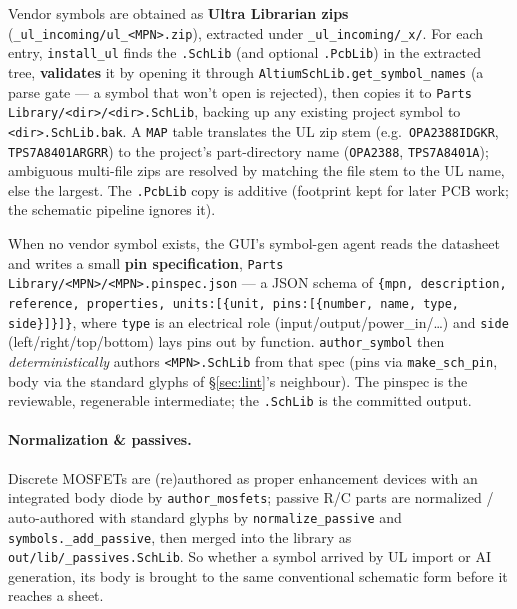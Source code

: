 \documentclass[11pt]{article}
\newcommand{\file}[1]{\texttt{#1}}
\newcommand{\mod}[1]{\texttt{#1}}
\begin{document}
\begin{description}[leftmargin=1.4em]
  \item[(1) Ultra Librarian import \textnormal{(\file{\_ul\_incoming/install\_ul.py})}.]
    Vendor symbols are obtained as \textbf{Ultra Librarian zips}
    (\file{\_ul\_incoming/ul\_<MPN>.zip}), extracted under \file{\_ul\_incoming/\_x/}.
    For each entry, \mod{install\_ul} finds the \file{.SchLib} (and optional
    \file{.PcbLib}) in the extracted tree, \textbf{validates} it by opening it
    through \texttt{AltiumSchLib.get\_symbol\_names} (a parse gate --- a symbol
    that won't open is rejected), then copies it to
    \file{Parts Library/<dir>/<dir>.SchLib}, backing up any existing project
    symbol to \file{<dir>.SchLib.bak}. A \texttt{MAP} table translates the UL zip
    stem (e.g.\ \texttt{OPA2388IDGKR}, \texttt{TPS7A8401ARGRR}) to the project's
    part-directory name (\texttt{OPA2388}, \texttt{TPS7A8401A}); ambiguous
    multi-file zips are resolved by matching the file stem to the UL name, else
    the largest. The \file{.PcbLib} copy is additive (footprint kept for later
    PCB work; the schematic pipeline ignores it).
  \item[(2) AI symbol generation \textnormal{(GUI Library tab $\to$
    \mod{author\_symbol})}.] When no vendor symbol exists, the GUI's symbol-gen
    agent reads the datasheet and writes a small \textbf{pin specification},
    \file{Parts Library/<MPN>/<MPN>.pinspec.json} --- a JSON schema of
    \texttt{\{mpn, description, reference, properties, units:[\{unit, pins:[\{number,
    name, type, side\}]\}]\}}, where \texttt{type} is an electrical role
    (input/output/power\_in/\dots) and \texttt{side} (left/right/top/bottom) lays
    pins out by function. \mod{author\_symbol} then \emph{deterministically}
    authors \file{<MPN>.SchLib} from that spec (pins via \texttt{make\_sch\_pin},
    body via the standard glyphs of \S\ref{sec:lint}'s neighbour). The pinspec is
    the reviewable, regenerable intermediate; the \file{.SchLib} is the committed
    output.
\end{description}

\paragraph{Normalization \& passives.} Discrete MOSFETs are (re)authored as
proper enhancement devices with an integrated body diode by \mod{author\_mosfets};
passive R/C parts are normalized / auto-authored with standard glyphs by
\mod{normalize\_passive} and \mod{symbols.\_add\_passive}, then merged into the
library as \file{out/lib/\_passives.SchLib}. So whether a symbol arrived by UL
import or AI generation, its body is brought to the same conventional schematic
form before it reaches a sheet.
\end{document}
